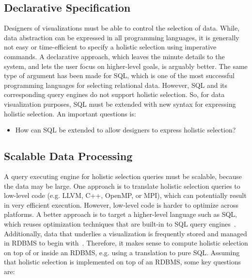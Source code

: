 \subsection{Declarative Specification} 
Designers of visualizations must be able to control the selection of data. While, data abstraction can be expressed in all programming languages, it is generally not easy or time-efficient to specify a holistic selection using imperative commands. A declarative approach, which leaves the minute details to the system, and lets the user focus on higher-level goals, is arguably better. The same type of argument has been made for SQL, which is one of the most successful programming languages for selecting relational data. However, SQL and its corresponding query engines do not support holistic selection. So, for data visualization purposes, SQL must be extended with new syntax for expressing holistic selection. An important questions is:

\begin{itemize}
\item How can SQL be extended to allow designers to express holistic selection?
\end{itemize}


\subsection{Scalable Data Processing} 
A query executing engine for holistic selection queries must be scalable, because the data may be large. One approach is to translate holistic selection queries to low-level code (e.g. LLVM, C++, OpenMP, or MPI), which can potentially result in very efficient execution. However, low-level code is harder to optimize across platforms. A better approach is to target a higher-level language such as SQL, which reuses optimization techniques that are built-in to SQL query engines~\cite{boncz2005pathfinder, boncz2006monetdb, grust2009ferry}. Additionally, data that underlies a visualization is frequently stored and managed in RDBMS to begin with~\cite{wu2014case}. Therefore, it makes sense to compute holistic selection on top of or inside an RDBMS, e.g. using a translation to pure SQL. Assuming that holistic selection is implemented on top of an RDBMS, some key questions are: 

